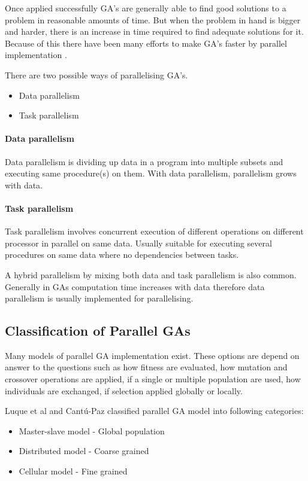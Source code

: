 \label{parallel_sga}
Once applied successfully GA's are generally able to find good solutions to a problem in reasonable amounts of time. But when the problem in hand is bigger and harder, there is an increase in time required to find adequate solutions for it. Because of this there have been many efforts to make GA's faster by parallel implementation \citep{cantu:98}.

There are two possible ways of parallelising GA's. 
\begin{itemize}
	\item Data parallelism
	\item Task parallelism
\end{itemize}

\paragraph{Data parallelism}
Data parallelism is dividing up data in a program into multiple subsets and executing same procedure(s) on them. With data parallelism, parallelism grows with data.
\paragraph{Task parallelism}
Task parallelism involves concurrent execution of different operations on different processor in parallel on same data. Usually suitable for executing several procedures on same data where no dependencies between tasks.
\citep{konfrst:04para}

A hybrid parallelism by mixing both data and task parallelism is also common. Generally in GAs computation time increases with data therefore data parallelism is usually implemented for parallelising.

\subsection{Classification of Parallel GAs}
Many models of parallel GA implementation exist. These options are depend on answer to the questions such as how fitness are evaluated, how mutation and crossover operations are applied, if a single or multiple population are used, how individuals are exchanged, if selection applied globally or locally.

Luque et al \citep{luque:05} and Cant\'{u}-Paz\citep{cantu:98} classified parallel GA model into following categories:
\begin{itemize}
	\item {Master-slave model - Global population}
	\item {Distributed  model - Coarse grained}
	\item{Cellular model - Fine grained}
\end{itemize}

